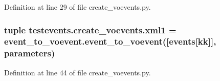 Definition at line 29 of file create\-\_\-voevents.\-py.

\hypertarget{namespacetestevents_1_1create__voevents_ad8ad71a3c97e80e15265f9cdcf854921}{
\subsubsection[{xml1}]{\setlength{\rightskip}{0pt plus 5cm}tuple testevents.\-create\-\_\-voevents.\-xml1 = {\bf event\-\_\-to\-\_\-voevent.\-event\-\_\-to\-\_\-voevent}(\mbox{[}{\bf events}\mbox{[}kk\mbox{]}\mbox{]}, {\bf parameters})}}\label{namespacetestevents_1_1create__voevents_ad8ad71a3c97e80e15265f9cdcf854921}


Definition at line 44 of file create\-\_\-voevents.\-py.

